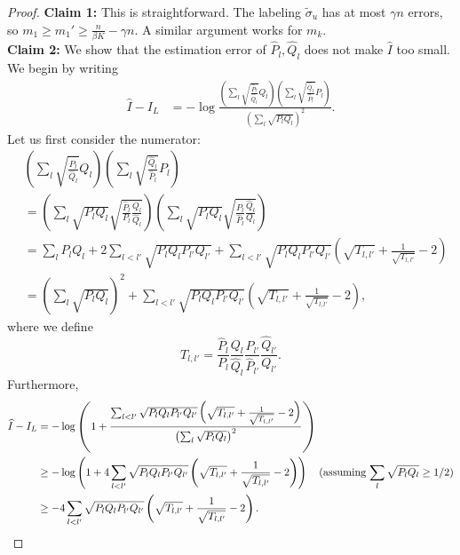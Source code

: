 \documentclass{article}
\begin{document}
\begin{proof}
\noindent \textbf{Claim 1:} This is straightforward. The labeling $\tilde \sigma_u$ has at most $\gamma n$ errors, so $m_1 \geq m_1' \geq \frac{n}{\beta K} - \gamma n$. A similar argument works for $m_k$.\\

\noindent \textbf{Claim 2:} We show that the estimation error of $\hat{P}_l, \hat{Q}_l$ does not make $\hat{I}$ too small. We begin by writing
\begin{align*}
\hat{I} - I_L &= - \log \frac{ 
     \left( \sum_l \sqrt{\frac{\hat{P}_l}{\hat{Q}_l}} Q_l \right)
     \left( \sum_l \sqrt{\frac{\hat{Q}_l}{\hat{P}_l}} P_l \right)}{ 
          \left( \sum_l \sqrt{P_l Q_l} \right)^2 }.
          \end{align*}
Let us first consider the numerator:
\begin{align*}
& \left( \sum_l \sqrt{ \frac{\hat{P}_l}{\hat{Q}_l}} Q_l \right)
\left( \sum_l \sqrt{ \frac{\hat{Q}_l}{\hat{P}_l}} P_l \right) \\
&= \left( \sum_l \sqrt{ P_l Q_l} \sqrt{ \frac{\hat{P}_l}{P_l} \frac{Q_l}{\hat{Q}_l}} \right) 
     \left( \sum_l \sqrt{P_l Q_l} \sqrt{ \frac{P_l}{\hat{P}_l} \frac{\hat{Q}_l}{ Q_l}} \right) \\
&= \sum_l P_l Q_l + 2\sum_{l < l'} \sqrt{P_l Q_l P_{l'} Q_{l'}} + 
   \sum_{l < l'} \sqrt{P_l Q_l P_{l'} Q_{l'}} \left( \sqrt{T_{l,l'}} + \frac{1}{\sqrt{T_{l,l'}}} - 2 \right) \\
&= \left( \sum_l \sqrt{P_l Q_l} \right)^2 + \sum_{l < l'} 
                  \sqrt{P_l Q_l P_{l'} Q_{l'}} \left( \sqrt{T_{l,l'}} + \frac{1}{\sqrt{T_{l,l'}}} - 2 \right), 
\end{align*}
where we define 
$$T_{l,l'} = \frac{\hat{P}_l}{P_l} \frac{Q_l}{\hat{Q}_l} \frac{P_{l'}}{\hat{P}_{l'}} \frac{\hat{Q}_{l'}}{Q_{l'}}.$$
Furthermore,
\begin{align}
\hat{I} - I_L &= - \log \left( 1 + \frac{ \sum_{l<l'} \sqrt{P_l Q_l P_{l'} Q_{l'}} 
    \left( \sqrt{T_{l,l'}} + \frac{1}{\sqrt{T_{l,l'}}} - 2 \right)}
    { \left( \sum_l \sqrt{ P_l Q_l} \right)^2 }  \right) \nonumber \\
     &  \geq  - \log \left( 1 + 4 \sum_{l<l'} \sqrt{P_l Q_l P_{l'} Q_{l'}}  
    \left( \sqrt{T_{l,l'}} + \frac{1}{\sqrt{T_{l,l'}}} - 2 \right)  \right) 
  \quad \trm{(assuming $\sum_l \sqrt{P_l Q_l} \geq 1/2$)} \nonumber \\
   & \geq - 4 \sum_{l < l'} \sqrt{P_l Q_l P_{l'} Q_{l'}} 
    \left( \sqrt{T_{l,l'}} + \frac{1}{\sqrt{T_{l,l'}}} - 2 \right). \label{eqn:Ihat_Istar2}

\end{align}
\end{proof}
\end{document}
